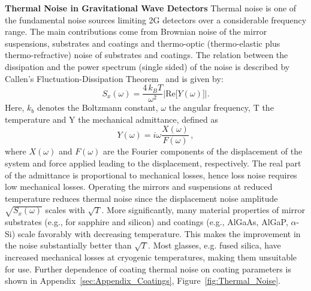\begin{Infobox}{\bf Thermal Noise in Gravitational Wave Detectors}
Thermal noise is one of the fundamental noise sources limiting 2G detectors over a considerable frequency range. The main contributions come from Brownian noise of the mirror suspensions, substrates and coatings and thermo-optic (thermo-elastic plus thermo-refractive) noise of substrates and coatings. The relation between the dissipation and the power spectrum (single sided) of the noise is described by Callen's Fluctuation-Dissipation Theorem~\cite{CaWe1951, Kubo:FDT, Callen:1959} and is given by:
\begin{equation}
S_x(\omega) = \frac{4\,k_B T}{\omega^2} \left| \mathrm{Re} \big[ Y(\omega) \big]\right| .
\end{equation}
\label{eq:FDT}
Here, $k_b$ denotes the Boltzmann constant, $\omega$ the angular frequency, T the temperature and Y the mechanical admittance, defined as
\begin{equation}
Y(\omega) = i \omega\frac{X(\omega)}{F(\omega)} \, ,
\end{equation}
where $X(\omega)$ and $F(\omega)$ are the Fourier components of the displacement of the system and force applied leading to the displacement, respectively. The real part of the admittance is proportional to mechanical losses, hence loss noise requires low mechanical losses.
Operating the mirrors and suspensions at reduced temperature reduces thermal noise since the displacement noise amplitude 
$\sqrt{S_x(\omega)}$ scales with $\sqrt{T}$. More significantly, many material properties of mirror substrates (e.g., for sapphire and silicon) and coatings (e.g., AlGaAs, AlGaP, $\alpha$-Si) scale favorably with decreasing temperature. 
This makes the improvement in the noise substantially better than $\sqrt{T}$. Most glasses, e.g. fused silica, have increased mechanical losses at cryogenic temperatures, making them unsuitable for use. 
Further dependence of coating thermal noise on coating parameters is shown in Appendix~\ref{sec:Appendix_Coatings}, Figure~\ref{fig:Thermal_Noise}.
\label{Box:Thermal}
\end{Infobox}

